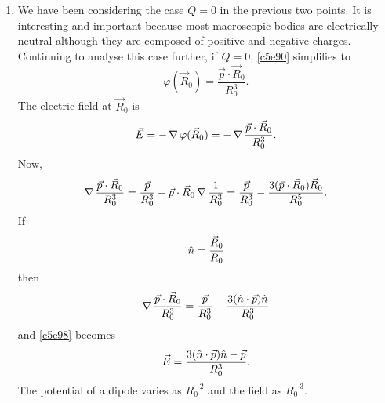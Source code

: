 \begin{enumerate}
\item We have been considering the case $Q = 0$ in the previous two points. It 
is interesting and important because most macroscopic bodies are electrically 
neutral although they are composed of positive and negative charges. Continuing 
to analyse this case further, if $Q = 0$, \eqref{c5e90} simplifies to
\begin{equation}\label{c5e97}
\varphi(\vec{R}_0) = \frac{\vec{p}\cdot\vec{R}_0}{R_0^3}.
\end{equation}
The electric field at $\vec{R}_0$ is
\begin{equation}\label{c5e98}
\vec{E} = -\operatorname{\nabla}\varphi(\vec{R}_0) = -\operatorname{\nabla}\frac{\vec{p}\cdot\vec{R}_0}{R_0^3}.
\end{equation}
Now,
\[
\operatorname{\nabla}\frac{\vec{p}\cdot\vec{R}_0}{R_0^3} = \frac{\vec{p}}{R_0^3} - 
\vec{p}\cdot\vec{R}_0\operatorname{\nabla}\frac{1}{R_0^3} = \frac{\vec{p}}{R_0^3} -
\frac{3(\vec{p}\cdot\vec{R}_0)\vec{R}_0}{R_0^5}.
\]
If 
\begin{equation}\label{c5e99}
\hat{n} = \frac{\vec{R}_0}{R_0}
\end{equation}
then
\begin{equation}\label{c5e100}
\operatorname{\nabla}\frac{\vec{p}\cdot\vec{R}_0}{R_0^3} = 
\frac{\vec{p}}{R_0^3} - \frac{3(\hat{n}\cdot\vec{p})\hat{n}}{R_0^3}
\end{equation}
and \eqref{c5e98} becomes
\begin{equation}\label{c5e101}
\vec{E} = \frac{3(\hat{n}\cdot\vec{p})\hat{n} - \vec{p}}{R_0^3}.
\end{equation}
The potential of a dipole varies as $R_0^{-2}$ and the field as $R_0^{-3}$.


\end{enumerate}
